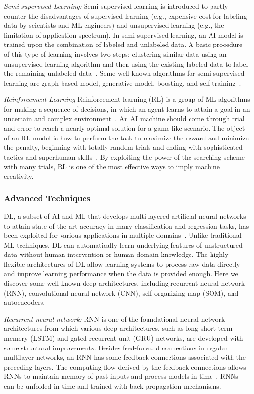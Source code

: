 \documentclass[journal]{IEEEtran}
\begin{document}
\textit{Semi-supervised Learning:}
Semi-supervised learning is introduced to partly counter the disadvantages of supervised learning (e.g., expensive cost for labeling data by scientists and ML engineers) and unsupervised learning (e.g., the limitation of application spectrum). 
In semi-supervised learning, an AI model is trained upon the combination of labeled and unlabeled data.
A basic procedure of this type of learning involves two steps: clustering similar data using an unsupervised learning algorithm and then using the existing labeled data to label the remaining unlabeled data~\cite{sheikhpour2017survey}.
Some well-known algorithms for semi-supervised learning are graph-based model, generative model, boosting, and self-training~\cite{van2020survey}.

\textit{Reinforcement Learning}
Reinforcement learning (RL) is a group of ML algorithms for making a sequence of decisions, in which an agent learns to attain a goal in an uncertain and complex environment~\cite{kiumarsi2018optimal}. 
An AI machine should come through trial and error to reach a nearly optimal solution for a game-like scenario.
The object of an RL model is how to perform the task to maximize the reward and minimize the penalty, beginning with totally random trials and ending with sophisticated tactics and superhuman skills~\cite{chen2021deep}. 
By exploiting the power of the searching scheme with many trials, RL is one of the most effective ways to imply machine creativity.

\subsubsection{Advanced Techniques}
DL, a subset of AI and ML that develops multi-layered artificial neural networks to attain state-of-the-art accuracy in many classification and regression tasks, has been exploited for various applications in multiple domains~\cite{ho2021short, hua2020dran, pham2021intelligent}.
Unlike traditional ML techniques, DL can automatically learn underlying features of unstructured data without human intervention or human domain knowledge. 
The highly flexible architectures of DL allow learning systems to process raw data directly and improve learning performance when the data is provided enough.
Here we discover some well-known deep architectures, including recurrent neural network (RNN), convolutional neural network (CNN), self-organizing map (SOM), and autoencoders.

\textit{Recurrent neural network:}
RNN is one of the foundational neural network architectures from which various deep architectures, such as long short-term memory (LSTM) and gated recurrent unit (GRU) networks, are developed with some structural improvements.
Besides feed-forward connections in regular multilayer networks, an RNN has some feedback connections associated with the preceding layers.
The computing flow derived by the feedback connections allows RNNs to maintain memory of past inputs and process models in time~\cite{lalapura2022recurrent}. 
RNNs can be unfolded in time and trained with back-propagation mechanisms.
\end{document}
